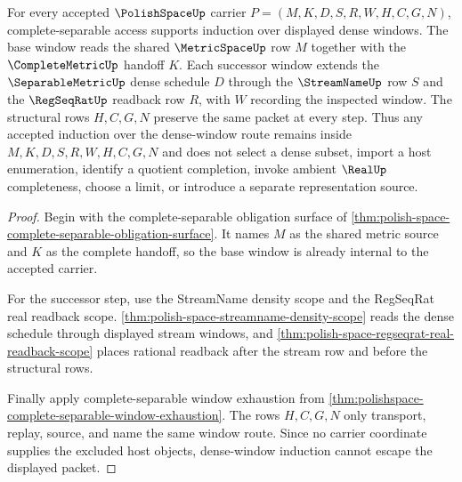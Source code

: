 \begin{theorem}
\label{thm:polishspace-complete-separable-dense-window-induction}
For every accepted $\PolishSpaceUp$ carrier $P=(M,K,D,S,R,W,H,C,G,N)$, complete-separable access supports induction over displayed dense windows. The base window reads the shared $\MetricSpaceUp$ row $M$ together with the $\CompleteMetricUp$ handoff $K$. Each successor window extends the $\SeparableMetricUp$ dense schedule $D$ through the $\StreamNameUp$ row $S$ and the $\RegSeqRatUp$ readback row $R$, with $W$ recording the inspected window. The structural rows $H,C,G,N$ preserve the same packet at every step. Thus any accepted induction over the dense-window route remains inside $M,K,D,S,R,W,H,C,G,N$ and does not select a dense subset, import a host enumeration, identify a quotient completion, invoke ambient $\RealUp$ completeness, choose a limit, or introduce a separate representation source.
\end{theorem}
\begin{proof}
Begin with the complete-separable obligation surface of \autoref{thm:polish-space-complete-separable-obligation-surface}. It names $M$ as the shared metric source and $K$ as the complete handoff, so the base window is already internal to the accepted carrier.

For the successor step, use the StreamName density scope and the RegSeqRat real readback scope. \autoref{thm:polish-space-streamname-density-scope} reads the dense schedule through displayed stream windows, and \autoref{thm:polish-space-regseqrat-real-readback-scope} places rational readback after the stream row and before the structural rows.

Finally apply complete-separable window exhaustion from \autoref{thm:polishspace-complete-separable-window-exhaustion}. The rows $H,C,G,N$ only transport, replay, source, and name the same window route. Since no carrier coordinate supplies the excluded host objects, dense-window induction cannot escape the displayed packet.
\end{proof}

